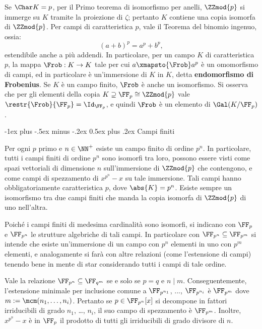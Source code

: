 \documentclass[10pt,landscape]{article}
\makeatletter
\renewcommand{\section}{\@startsection{section}{1}{0mm}%
	{-1ex plus -.5ex minus -.2ex}%
	{0.5ex plus .2ex}%
	{\normalfont\large\bfseries}}
\makeatother
\begin{document}
\begin{multicols}{3}
		Se $\Char K = p$, per il Primo
		teorema di isomorfismo per anelli, $\ZZmod{p}$ si immerge
		su $K$ tramite la proiezione di $\zeta$; pertanto
		$K$ contiene una copia isomorfa di $\ZZmod{p}$. Per
		campi di caratteristica $p$, vale il Teorema del
		binomio ingenuo, ossia:
		\[ (a + b)^p = a^p + b^p, \]
		estendibile anche a più addendi.
		In particolare, per un campo $K$ di caratteristica $p$,
		la mappa $\Frob : K \to K$ tale per cui $a \xmapsto{\Frob} a^p$
		è un omomorfismo di campi, ed in particolare è un'immersione
		di $K$ in $K$, detta \textbf{endomorfismo di Frobenius}. Se $K$ è un campo finito, $\Frob$ è anche
		un isomorfismo. Si osserva che per gli elementi della
		copia $K \supseteq \FF_p \cong \ZZmod{p}$ vale
		$\restr{\Frob}{\FF_p} = \Id_{\FF_p}$, e quindi
		$\Frob$ è un elemento di $\Gal(K / \FF_p)$. 
		
		
		\section{Campi finiti}
		
		
		Per ogni $p$ primo e $n \in \NN^+$ esiste un campo finito
		di ordine $p^n$. In particolare, tutti i campi finiti di
		ordine $p^n$ sono isomorfi tra loro, possono essere visti
		come spazi vettoriali di dimensione $n$ sull'immersione di $\ZZmod{p}$ che contengono,
		e come campi di spezzamento di $x^{p^n}-x$
		su tale immersione. Tali campi hanno obbligatoriamente
		caratteristica $p$, dove $\abs{K} = p^n$. Esiste
		sempre un isomorfismo tra due campi finiti che manda la copia isomorfa di $\ZZmod{p}$ di uno nell'altra. \medskip
		
		
		Poiché i campi finiti di medesima cardinalità sono isomorfi,
		si indicano con $\FF_p$ e $\FF_{p^n}$ le strutture
		algebriche di tali campi. In particolare con
		$\FF_{p^n} \subseteq \FF_{p^m}$ si intende che
		esiste un'immersione di un campo con $p^n$ elementi in
		uno con $p^m$ elementi, e analogamente si farà con
		altre relazioni (come l'estensione di campi)
		tenendo bene in mente di star
		considerando tutti i campi di tale ordine. \medskip
		
		
		Vale la relazione $\FF_{p^n} \subseteq \FF_{q^m}$
		se e solo se $p=q$ e $n \mid m$. Conseguentemente,
		l'estensione minimale per inclusione comune a
		$\FF_{p^{n_1}}$, ..., $\FF_{p^{n_i}}$ è
		$\FF_{p^m}$ dove $m := \mcm(n_1, \ldots, n_i)$. Pertanto
		se $p \in \FF_{p^n}[x]$ si decompone in fattori irriducibili
		di grado $n_1$, \ldots, $n_i$, il suo campo di spezzamento
		è $\FF_{p^m}$. Inoltre, $x^{p^n}-x$ è in $\FF_p$ il
		prodotto di tutti gli irriducibili di grado divisore
		di $n$.
		

\end{multicols}
\end{document}
